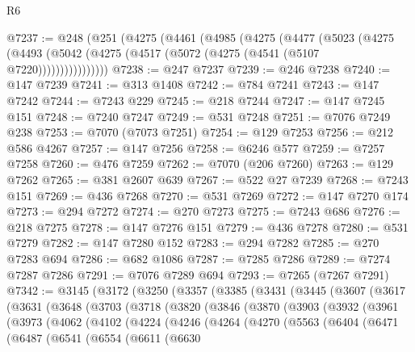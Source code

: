 \begin{lexlean}{R6}
\begin{coremodule}
@7237 := @248
    (@251
      (@4275
        (@4461
          (@4985
            (@4275
              (@4477
                (@5023
                  (@4275
                    (@4493 (@5042 (@4275 (@4517 (@5072 (@4275 (@4541 (@5107 @7220))))))))))))))))
@7238 := @247 @7237
@7239 := @246 @7238
@7240 := @147 @7239
@7241 := @313 @1408
@7242 := @784 @7241
@7243 := @147 @7242
@7244 := @7243 @229
@7245 := @218 @7244
@7247 := @147 @7245 @151
@7248 := @7240 @7247
@7249 := @531 @7248
@7251 := @7076 @7249 @238
@7253 := @7070 (@7073 @7251)
@7254 := @129 @7253
@7256 := @212 @586 @4267
@7257 := @147 @7256
@7258 := @6246 @577
@7259 := @7257 @7258
@7260 := @476 @7259
@7262 := @7070 (@206 @7260)
@7263 := @129 @7262
@7265 := @381 @2607 @639
@7267 := @522 @27 @7239
@7268 := @7243 @151
@7269 := @436 @7268
@7270 := @531 @7269
@7272 := @147 @7270 @174
@7273 := @294 @7272
@7274 := @270 @7273
@7275 := @7243 @686
@7276 := @218 @7275
@7278 := @147 @7276 @151
@7279 := @436 @7278
@7280 := @531 @7279
@7282 := @147 @7280 @152
@7283 := @294 @7282
@7285 := @270 @7283 @694
@7286 := @682 @1086
@7287 := @7285 @7286
@7289 := @7274 @7287 @7286
@7291 := @7076 @7289 @694
@7293 := @7265 (@7267 @7291)
@7342 := @3145
    (@3172
      (@3250
        (@3357
          (@3385
            (@3431
              (@3445
                (@3607
                  (@3617
                    (@3631
                      (@3648
                        (@3703
                          (@3718
                            (@3820
                              (@3846
                                (@3870
                                  (@3903
                                    (@3932
                                      (@3961
                                        (@3973
                                          (@4062
                                            (@4102
                                              (@4224
                                                (@4246
                                                  (@4264
                                                    (@4270
                                                      (@5563
                                                        (@6404
                                                          (@6471
                                                            (@6487
                                                              (@6541
                                                                (@6554
                                                                  (@6611
                                                                    (@6630

\end{coremodule}
\end{lexlean}
